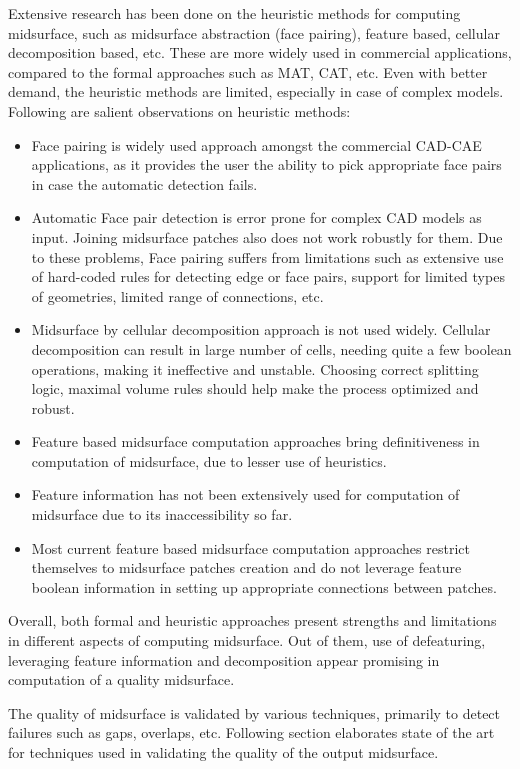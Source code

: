 Extensive research has been done on the heuristic methods for computing midsurface, such as midsurface abstraction (face pairing), feature based, cellular decomposition based, etc. These are more widely used in commercial applications, compared to the formal approaches such as MAT, CAT, etc. Even with better  demand, the heuristic methods are limited, especially in case of complex models. Following are salient observations on heuristic methods:

\begin{itemize}[noitemsep,topsep=2pt,parsep=2pt,partopsep=2pt]
\item Face pairing is widely used approach amongst the commercial CAD-CAE applications, as it provides the user the ability to pick appropriate face pairs in case the automatic detection fails. 
\item Automatic Face pair detection is error prone for complex CAD models as input. Joining midsurface patches also does not work robustly for them. Due to these problems, Face pairing suffers from limitations such as extensive use of hard-coded rules for detecting edge or face pairs, support for limited types of geometries, limited range of connections, etc.
\item Midsurface by cellular decomposition approach is not used widely. Cellular decomposition can result in large number of cells, needing quite a few boolean operations, making it ineffective and unstable. Choosing correct splitting logic, maximal volume rules should help make the process optimized and robust.
\item Feature based midsurface computation approaches bring definitiveness in computation of midsurface, due to lesser use of heuristics.
\item Feature information has not been extensively used for computation of midsurface due to its inaccessibility so far. 
\item Most current feature based midsurface computation approaches restrict themselves to midsurface patches creation and do not leverage feature boolean information in setting up appropriate connections between patches.
 \end{itemize}

Overall, both formal and heuristic approaches present strengths and limitations in different aspects of computing midsurface. Out of them, use of defeaturing, leveraging feature information and decomposition appear promising in computation of a quality midsurface. 

The quality of midsurface is validated by various techniques, primarily to detect failures such as gaps, overlaps, etc.
Following section elaborates state of the art for techniques used in validating the quality of the output midsurface.

